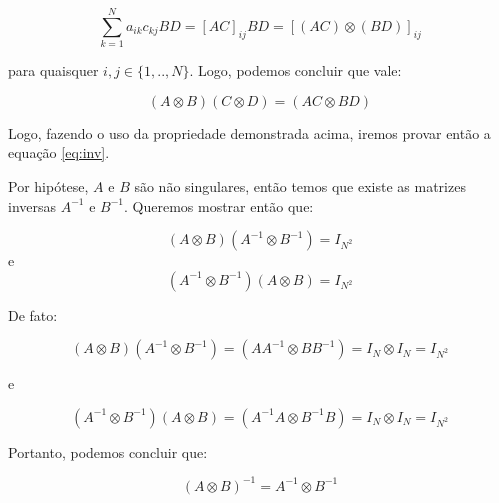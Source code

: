 \documentclass[]{abntex2}
\begin{document}
\begin{equation*}
	\sum_{k=1}^{N} a_{ik}c_{kj}BD = {[AC]}_{ij} BD =  {[(AC) \otimes (BD)]}_{ij}
\end{equation*}

para quaisquer $i,j \in \{1,..,N\}$. Logo, podemos concluir que vale:

\begin{equation*}
	(A \otimes B)(C \otimes D) = (AC \otimes BD)
\end{equation*}

Logo, fazendo o uso da propriedade demonstrada acima, iremos provar então a equação \ref{eq:inv}. 

Por hipótese, $A$ e $B$ são não singulares, então temos que existe as matrizes inversas $A^{-1}$ e $B^{-1}$. Queremos mostrar então que:

\begin{equation*}
	(A \otimes B)(A^{-1} \otimes B^{-1}) = I_{N^2}
\end{equation*}
e
\begin{equation*}
	(A^{-1} \otimes B^{-1}) (A \otimes B) = I_{N^2}
\end{equation*}

De fato:

\begin{equation*}
	(A \otimes B)(A^{-1} \otimes B^{-1}) = (A{A}^{-1} \otimes B{B}^{-1}) = I_N \otimes I_N = I_{N^2}
\end{equation*}

e

\begin{equation*}
	(A^{-1} \otimes B^{-1}) (A \otimes B) = ({A}^{-1}A \otimes {B}^{-1}B) = I_N \otimes I_N = I_{N^2}
\end{equation*}

Portanto, podemos concluir que:

\begin{tcolorbox}
	\[
		{(A \otimes B)}^{-1} = A^{-1} \otimes B^{-1}
	\]
	\end{tcolorbox}

\end{document}
